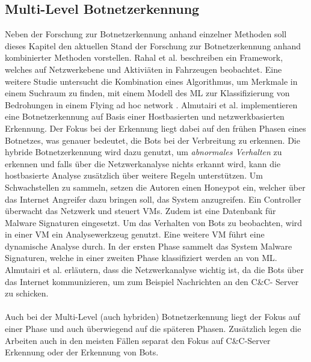 \subsection*{Multi-Level Botnetzerkennung}
Neben der Forschung zur Botnetzerkennung anhand einzelner Methoden soll dieses Kapitel den aktuellen Stand der Forschung zur Botnetzerkennung anhand kombinierter Methoden vorstellen. Rahal et al. 
\cite{DBLP:journals/jnsm/RahalKGCG22} beschreiben ein Framework, welches auf Netzwerkebene und Aktiviäten in Fahrzeugen beobachtet. Eine weitere Studie untersucht die Kombination eines Algorithmus,
um Merkmale in einem Suchraum zu finden, mit einem Modell des ML zur Klassifizierung von Bedrohungen in einem Flying ad hoc network \cite{DBLP:journals/bdcc/AbdulsattarAGKA22}. Almutairi et al.
\cite{DBLP:journals/jcnc/AlmutairiMAA20} implementieren eine Botnetzerkennung auf Basis einer Hostbasierten und netzwerkbasierten Erkennung. Der Fokus bei der Erkennung liegt dabei auf den frühen
Phasen eines Botnetzes, was genauer bedeutet, die Bots bei der Verbreitung zu erkennen. Die hybride Botnetzerkennung wird dazu genutzt, um \textit{abnormales Verhalten} zu erkennen und falls über 
die Netzwerkanalyse nichts erkannt wird, kann die hostbasierte Analyse zusätzlich über weitere Regeln unterstützen. Um Schwachstellen zu sammeln, setzen die Autoren einen Honeypot ein, welcher über
das Internet Angreifer dazu bringen soll, das System anzugreifen. Ein Controller überwacht das Netzwerk und steuert VMs. Zudem ist eine Datenbank für Malware Signaturen eingesetzt. Um das Verhalten
von Bots zu beobachten, wird in einer VM ein Analysewerkzeug genutzt. Eine weitere VM führt eine dynamische Analyse durch. In der ersten Phase sammelt das System Malware Signaturen, welche in einer
zweiten Phase klassifiziert werden an von ML. Almutairi et al. erläutern, dass die Netzwerkanalyse wichtig ist, da die Bots über das Internet kommunizieren, um zum Beispiel Nachrichten an den C\&C-
Server zu schicken. \\ \\ Auch bei der Multi-Level (auch hybriden) Botnetzerkennung liegt der Fokus auf einer Phase und auch überwiegend auf die späteren Phasen. Zusätzlich legen die Arbeiten auch in
den meisten Fällen separat den Fokus auf C\&C-Server Erkennung oder der Erkennung von Bots.


